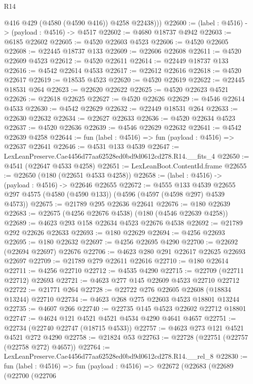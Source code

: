\begin{lexlean}{R14}
\begin{coremodule}
          @416
          @429
          (@4580 (@4590 @416))
          @4258
          @22438)))
@22600 := (label : @4516) -> (payload : @4516) -> @4517
@22602 := @4680 @18737 @4942
@22603 := @6185 @22602
@22605 := @4520 @22603 @4523
@22606 := @4520 @22605
@22608 := @22445 @18737 @133
@22609 := @22606 @22608
@22611 := @4520 @22609 @4523
@22612 := @4520 @22611
@22614 := @22449 @18737 @133
@22616 := @4542 @22614 @4533
@22617 := @22612 @22616
@22618 := @4520 @22617
@22619 := @18535 @4523
@22620 := @4520 @22619
@22622 := @22445 @18531 @264
@22623 := @22620 @22622
@22625 := @4520 @22623 @4521
@22626 := @22618 @22625
@22627 := @4520 @22626
@22629 := @4546 @22614 @4533
@22630 := @4542 @22629
@22632 := @22449 @18531 @264
@22633 := @22630 @22632
@22634 := @22627 @22633
@22636 := @4520 @22634 @4523
@22637 := @4520 @22636
@22639 := @4546 @22629 @22632
@22641 := @4542 @22639 @4258
@22644 := fun (label : @4516) => fun (payload : @4516) => @22637 @22641
@22646 := @4531 @133 @4539
@22647 := LexLeanPreserve.Cae4456d77aa62528ed0bd9d0612cd278.R14.__fits_4
@22650 := @4541 (@22647 @4533 @4258)
@22651 := LexLeanBoot.ContentId.frame
@22655 := @22650 (@180 (@22651 @4533 @4258))
@22658 := (label : @4516) -> (payload : @4516) -> @22646 @22655
@22672 := @4555
    @133
    @4539
    @22655
    @297
    @4575
    (@4580 (@4590 @133))
    (@4596 (@4597 (@4598 @297) @4539 @4573))
@22675 := @21789 @295 @22636 @22641
@22676 := @180 @22639
@22683 := @22675 (@4256 @22676 @4538) (@180 (@4546 @22639 @4258))
@22689 := @4623 @293 @158 @22634 @4523 @22676 @4538
@22692 := @21789 @292 @22626 @22633
@22693 := @180 @22629
@22694 := @4256 @22693
@22695 := @180 @22632
@22697 := @4256 @22695 @4290
@22700 := @22692 (@22694 @22697) @22676
@22706 := @4623 @280 @291 @22617 @22625 @22693 @22697
@22709 := @21789 @279 @22611 @22616
@22710 := @180 @22614
@22711 := @4256 @22710
@22712 := @4535 @4290
@22715 := @22709 (@22711 @22712) @22693
@22721 := @4623 @277 @145 @22609 @4523 @22710 @22712
@22722 := @21771 @264
@22728 := @22722 @276 @22605 @22608 (@18834 @13244) @22710
@22734 := @4623 @268 @275 @22603 @4523 @18801 @13244
@22735 := @4607 @266
@22740 := @22735 @145 @4523 @22602 @22712 @18801
@22747 := @4624 @121 @4521 @4521 @4534 @4290 @4641 @4657
@22751 := @22734 (@22740 @22747 (@18715 @4533))
@22757 := @4623 @273 @121 @4521 @4521 @272 @4290
@22758 := @21824 @53
@22763 := @22728 (@22751 (@22757 (@22758 @272) @4657))
@22764 := LexLeanPreserve.Cae4456d77aa62528ed0bd9d0612cd278.R14.__rel_8
@22830 := fun (label : @4516) =>
  fun (payload : @4516) =>
  @22672
    (@22683
      (@22689
        (@22700
          (@22706

\end{coremodule}
\end{lexlean}
